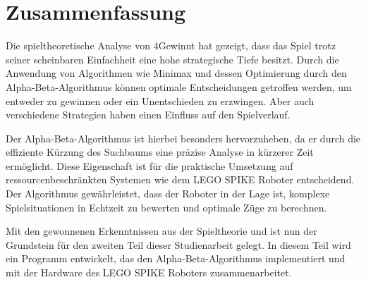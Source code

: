 \chapter{Zusammenfassung}


Die spieltheoretische Analyse von 4Gewinnt hat gezeigt, dass das Spiel trotz seiner scheinbaren Einfachheit eine hohe strategische Tiefe besitzt. Durch die Anwendung von Algorithmen wie Minimax und dessen Optimierung durch den Alpha-Beta-Algorithmus können optimale Entscheidungen getroffen werden, um entweder zu gewinnen oder ein Unentschieden zu erzwingen. Aber auch verschiedene Strategien haben einen Einfluss auf den Spielverlauf.

Der Alpha-Beta-Algorithmus ist hierbei besonders hervorzuheben, da er durch die effiziente Kürzung des Suchbaums eine präzise Analyse in kürzerer Zeit ermöglicht. Diese Eigenschaft ist für die praktische Umsetzung auf ressourcenbeschränkten Systemen wie dem LEGO SPIKE Roboter entscheidend. Der Algorithmus gewährleistet, dass der Roboter in der Lage ist, komplexe Spielsituationen in Echtzeit zu bewerten und optimale Züge zu berechnen.

Mit den gewonnenen Erkenntnissen aus der Spieltheorie und ist nun der Grundstein für den zweiten Teil dieser Studienarbeit gelegt. In diesem Teil wird ein Programm entwickelt, das den Alpha-Beta-Algorithmus implementiert und mit der Hardware des LEGO SPIKE Roboters zusammenarbeitet. 


